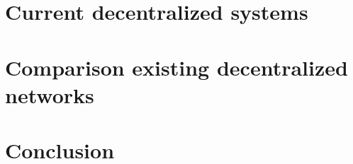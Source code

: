\documentclass[journal]{IEEEtran}
\begin{document}
\section{Current decentralized systems}
	\label{sec:decentralized}
	

\section{Comparison existing decentralized networks}
	\label{sec:comparison}
	

\section{Conclusion}
	\label{sec:conclusion}
	

\appendices


\end{document}
